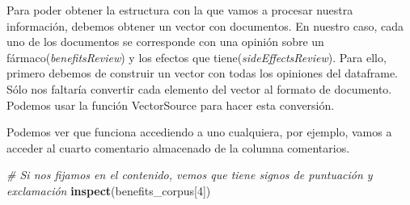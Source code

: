 \documentclass[spanish,]{article}
\newenvironment{Shaded}{\begin{snugshade}}{\end{snugshade}}
\newcommand{\CommentTok}[1]{\textcolor[rgb]{0.56,0.35,0.01}{\textit{#1}}}
\newcommand{\DecValTok}[1]{\textcolor[rgb]{0.00,0.00,0.81}{#1}}
\newcommand{\KeywordTok}[1]{\textcolor[rgb]{0.13,0.29,0.53}{\textbf{#1}}}
\newcommand{\NormalTok}[1]{#1}
\newcommand{\OperatorTok}[1]{\textcolor[rgb]{0.81,0.36,0.00}{\textbf{#1}}}
\newcommand{\StringTok}[1]{\textcolor[rgb]{0.31,0.60,0.02}{#1}}
\begin{document}
Para poder obtener la estructura con la que vamos a procesar nuestra
información, debemos obtener un vector con documentos. En nuestro caso,
cada uno de los documentos se corresponde con una opinión sobre un
fármaco(\emph{benefitsReview}) y los efectos que
tiene(\emph{sideEffectsReview}). Para ello, primero debemos de construir
un vector con todas los opiniones del dataframe. Sólo nos faltaría
convertir cada elemento del vector al formato de documento. Podemos usar
la función VectorSource para hacer esta conversión.

\begin{Shaded}
\end{Shaded}

Podemos ver que funciona accediendo a uno cualquiera, por ejemplo, vamos
a acceder al cuarto comentario almacenado de la columna comentarios.

\begin{Shaded}
\begin{Highlighting}[]
\CommentTok{# Si nos fijamos en el contenido, vemos que tiene signos de puntuación y exclamación}
\KeywordTok{inspect}\NormalTok{(benefits_corpus[}\DecValTok{4}\NormalTok{])}
\end{Highlighting}
\end{Shaded}
\end{document}
